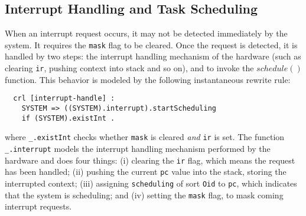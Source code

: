 \documentclass{llncs}
\begin{document}
\subsection{Interrupt Handling and Task Scheduling}
\label{ss:inthandling}
When an interrupt request occurs, it may not be detected immediately
by the system. It requires the \verb|mask| flag to be cleared. Once
the request is detected, it is handled by two steps: the interrupt
handling mechanism of the hardware (such as clearing \verb|ir|,
pushing context into stack and so on), and to invoke the $schedule()$
function. This behavior is modeled by the following instantaneous
rewrite rule:
\begin{verbatim}
  crl [interrupt-handle] :
    SYSTEM => ((SYSTEM).interrupt).startScheduling
    if (SYSTEM).existInt .
\end{verbatim}
where \verb|_.existInt| checks whether \verb|mask| is cleared
\emph{and} \verb|ir| is set. The function \verb|_.interrupt| models
the interrupt handling mechanism performed by the hardware and does
four things: (i) clearing the \verb|ir| flag, which means the request
has been handled; (ii) pushing the current \verb|pc| value into the
stack, storing the interrupted context; (iii) assigning
\verb|scheduling| of sort \verb|Oid| to \verb|pc|, which indicates
that the system is scheduling; and (iv) setting the \verb|mask| flag,
to mask coming interrupt requests. 
\end{document}
